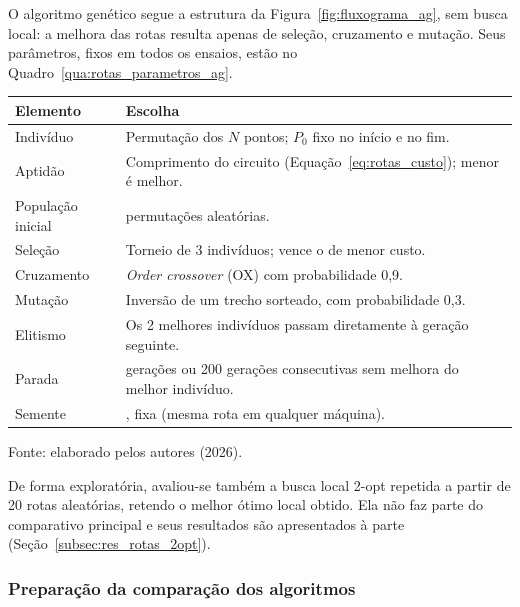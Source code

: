 O algoritmo genético segue a estrutura da Figura~\ref{fig:fluxograma_ag}, sem busca local: a melhora das rotas resulta apenas de seleção, cruzamento e mutação. Seus parâmetros, fixos em todos os ensaios, estão no Quadro~\ref{qua:rotas_parametros_ag}.

\begin{quadro}[H]
    \centering
    \caption{Parâmetros do algoritmo genético.}
    \label{qua:rotas_parametros_ag}
    \small
    \renewcommand{\arraystretch}{1.3}
    \begin{tabular}{|>{\raggedright\arraybackslash}p{3.6cm}|>{\raggedright\arraybackslash}p{10.0cm}|}
        \hline
        \textbf{Elemento} & \textbf{Escolha} \\
        \hline
        Indivíduo & Permutação dos $N$ pontos; $P_0$ fixo no início e no fim. \\
        \hline
        Aptidão & Comprimento do circuito (Equação~\ref{eq:rotas_custo}); menor é melhor. \\
        \hline
        População inicial & 120 permutações aleatórias. \\
        \hline
        Seleção & Torneio de 3 indivíduos; vence o de menor custo. \\
        \hline
        Cruzamento & \textit{Order crossover} (OX) com probabilidade 0,9. \\
        \hline
        Mutação & Inversão de um trecho sorteado, com probabilidade 0,3. \\
        \hline
        Elitismo & Os 2 melhores indivíduos passam diretamente à geração seguinte. \\
        \hline
        Parada & 800 gerações ou 200 gerações consecutivas sem melhora do melhor indivíduo. \\
        \hline
        Semente & 2026, fixa (mesma rota em qualquer máquina). \\
        \hline
    \end{tabular}
    \par\vspace{0.2cm}
    \footnotesize Fonte: elaborado pelos autores (2026).
\end{quadro}

De forma exploratória, avaliou-se também a busca local 2-opt repetida a partir de 20 rotas aleatórias, retendo o melhor ótimo local obtido. Ela não faz parte do comparativo principal e seus resultados são apresentados à parte (Seção~\ref{subsec:res_rotas_2opt}).

\subsubsection{Preparação da comparação dos algoritmos}\label{subsubsec:rotas_benchmark}

